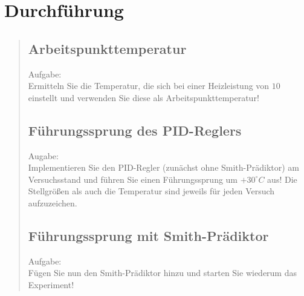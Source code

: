 \section{Durchführung}
\begin{quote}
    
    
    \subsection{Arbeitspunkttemperatur}
    \begin{quote}
        
    \end{quote}
    Aufgabe:\\
    Ermitteln Sie die Temperatur, die sich bei einer Heizleistung von $10$ einstellt und verwenden Sie diese als
    Arbeitspunkttemperatur!\vspace{1em}
    
    \begin{quote}
        
    \end{quote}
    
    \subsection{Führungssprung des PID-Reglers}
    
    Augabe:\\
    Implementieren Sie den PID-Regler (zunächst ohne Smith-Prädiktor) am Versuchsstand und führen Sie einen
    Führungssprung um $+30^{\circ} C$ aus! Die Stellgrößen als auch die Temperatur sind jeweils für jeden Versuch
    aufzuzeichen.\vspace{1em}
    
    \begin{quote}
        
    \end{quote}
    
    
    \subsection{Führungssprung mit Smith-Prädiktor}
    
    Aufgabe:\\
    Fügen Sie nun den Smith-Prädiktor hinzu und starten Sie wiederum das Experiment!\vspace{1em}
    
    \begin{quote}
        

\end{quote}
\end{quote}
